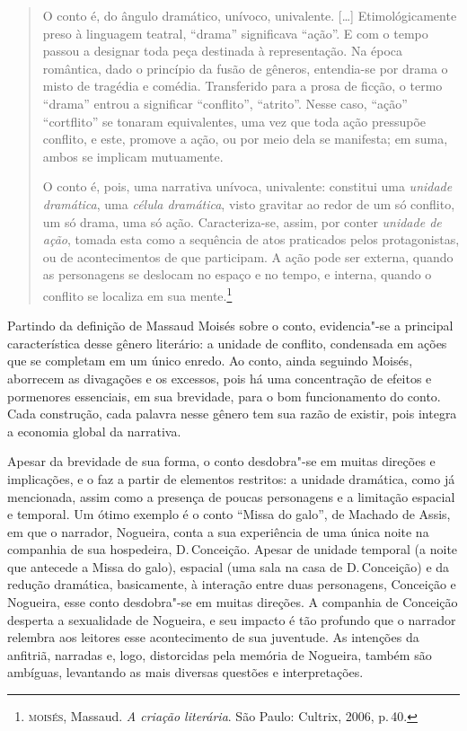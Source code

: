 \begin{quote}
O conto é, do ângulo dramático, unívoco, univalente. [\ldots]
Etimológicamente preso à linguagem teatral,
``drama'' significava ``ação''. E com o tempo passou a designar
toda peça destinada à representação. Na época romântica, dado o
princípio da fusão de gêneros, entendia-se por drama o misto de
tragédia e comédia. Transferido para a prosa de ficção, o termo
``drama'' entrou a significar ``conflito'', ``atrito''. Nesse caso,
``ação'' ``cortflito'' se tonaram equivalentes, uma vez que toda
ação pressupõe conflito, e este, promove a ação, ou por meio dela
se manifesta; em suma, ambos se implicam mutuamente.

O conto é, pois, uma narrativa unívoca, univalente: constitui
uma \textit{unidade dramática}, uma \textit{célula dramática}, visto gravitar ao
redor de um só conflito, um só drama, uma só ação. Caracteriza-se,
assim, por conter \textit{unidade de ação}, tomada esta como a sequência de atos praticados pelos protagonistas, ou de acontecimentos de
que participam. A ação pode ser externa, quando as personagens se
deslocam no espaço e no tempo, e interna, quando o conflito se
localiza em sua mente.\footnote{\textsc{moisés}, Massaud. \textit{A criação literária}. São Paulo: Cultrix, 2006, p.\,40.}
\end{quote}

Partindo da definição de Massaud Moisés sobre o conto, evidencia"-se a principal característica desse gênero literário: a unidade de conflito, condensada em ações que se completam em um único enredo. Ao conto, ainda seguindo Moisés, aborrecem as divagações e os excessos, pois há uma concentração de efeitos e pormenores essenciais, em sua brevidade, para o bom funcionamento do conto.
Cada construção, cada palavra nesse gênero tem sua razão de existir, pois integra a economia global da narrativa.

Apesar da brevidade de sua forma, o conto desdobra"-se em muitas direções e implicações, e o faz a partir de elementos restritos: a unidade dramática, como já mencionada, assim como a presença de poucas personagens e a limitação espacial e temporal. Um ótimo exemplo é o conto ``Missa do galo'', de Machado de Assis, em que o narrador, Nogueira, conta a sua experiência de uma única noite na companhia de sua hospedeira, D.\,Conceição. Apesar de unidade temporal (a noite que antecede a Missa do galo), espacial (uma sala na casa de D.\,Conceição) e da redução dramática, basicamente, à interação entre duas personagens, Conceição e Nogueira, esse conto desdobra"-se em muitas direções. A companhia de Conceição desperta a sexualidade de Nogueira, e seu impacto é tão profundo que o narrador relembra aos leitores esse acontecimento de sua juventude. As intenções da anfitriã, narradas e, logo, distorcidas pela memória de Nogueira, também são ambíguas, levantando as mais diversas questões e interpretações.

